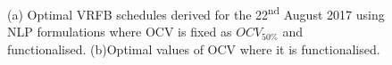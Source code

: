 \documentclass[preprint,3p,review,authoryear,10pt]{elsarticle}
\begin{document}
\begin{figure}[!ht]
\centering
{}
\caption{(a) Optimal VRFB schedules derived for the 22\textsuperscript{nd} August 2017 using NLP formulations where OCV is fixed as $OCV_{50\%}$ and functionalised. (b)Optimal values of OCV where it is functionalised.}
\end{figure}
\end{document}
